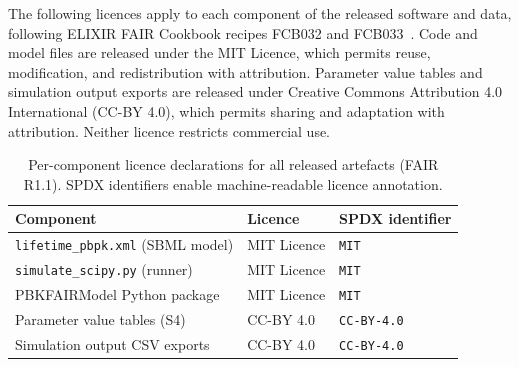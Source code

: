 \documentclass[12pt]{article}
\begin{document}
The following licences apply to each component of the released software and data, following ELIXIR FAIR Cookbook recipes FCB032 and FCB033~\citep{rocca2023}. Code and model files are released under the MIT Licence, which permits reuse, modification, and redistribution with attribution. Parameter value tables and simulation output exports are released under Creative Commons Attribution 4.0 International (CC-BY 4.0), which permits sharing and adaptation with attribution. Neither licence restricts commercial use.

\begin{table}[h]
\centering
\caption{Per-component licence declarations for all released artefacts (FAIR R1.1). SPDX identifiers enable machine-readable licence annotation.}
\label{tab:licences}
\begin{tabular}{p{5.5cm} p{4cm} p{3.5cm}}
\toprule
\textbf{Component} & \textbf{Licence} & \textbf{SPDX identifier} \\
\midrule
\texttt{lifetime\_pbpk.xml} (SBML model) & MIT Licence & \texttt{MIT} \\
\texttt{simulate\_scipy.py} (runner) & MIT Licence & \texttt{MIT} \\
PBKFAIRModel Python package & MIT Licence & \texttt{MIT} \\
Parameter value tables (S4) & CC-BY 4.0 & \texttt{CC-BY-4.0} \\
Simulation output CSV exports & CC-BY 4.0 & \texttt{CC-BY-4.0} \\
\bottomrule
\end{tabular}
\end{table}

\end{document}
